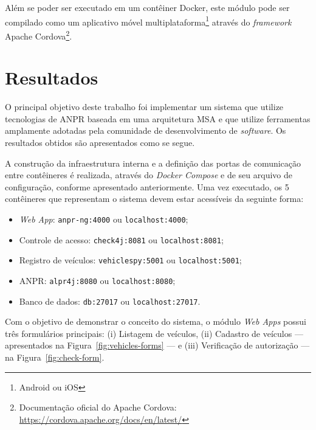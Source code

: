 \documentclass[12pt]{article}
\begin{document}
Além se poder ser executado em um contêiner Docker, este módulo pode ser compilado como um aplicativo móvel multiplataforma\footnote{Android ou iOS} através do \textit{framework} Apache Cordova\footnote{Documentação oficial do Apache Cordova: \url{https://cordova.apache.org/docs/en/latest/}}.

\section{Resultados}

O principal objetivo deste trabalho foi implementar um sistema que utilize tecnologias de ANPR baseada em uma arquitetura MSA e que utilize ferramentas amplamente adotadas pela comunidade de desenvolvimento de \textit{software}. Os resultados obtidos são apresentados como se segue.

A construção da infraestrutura interna e a definição das portas de comunicação entre contêineres é realizada, através do \textit{Docker Compose} e de seu arquivo de configuração, conforme apresentado anteriormente. Uma vez executado, os 5 contêineres que representam o sistema devem estar acessíveis da seguinte forma:

\begin{itemize}
\item \textit{Web App}: \texttt{anpr-ng:4000} ou \texttt{localhost:4000};
\item Controle de acesso: \texttt{check4j:8081} ou \texttt{localhost:8081};
\item Registro de veículos: \texttt{vehiclespy:5001} ou \texttt{localhost:5001};
\item ANPR: \texttt{alpr4j:8080} ou \texttt{localhost:8080};
\item Banco de dados: \texttt{db:27017} ou \texttt{localhost:27017}.
\end{itemize}

Com o objetivo de demonstrar o conceito do sistema, o módulo \textit{Web Apps} possui três formulários principais: (i) Listagem de veículos, (ii) Cadastro de veículos — apresentados na Figura~\ref{fig:vehicles-forms} — e (iii) Verificação de autorização — na Figura~\ref{fig:check-form}.
\end{document}
